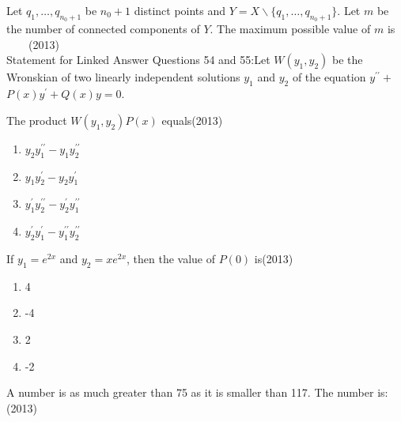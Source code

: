 \iffalse
\chapter{2013}
\author{Prajwal naik}
\section{ma}
\fi

    \item Let $q_{1}, \ldots, q_{n_{0}+1}$ be $n_{0}+1$ distinct points and $Y=X \backslash\{q_{1}, \ldots, q_{n_{0}+1}\}$. Let $m$ be the number of connected components of $Y$. The maximum possible value of $m$ is $\qquad$(\hfill{2013})\\
    {Statement for Linked Answer Questions 54 and 55:}Let $W\left(y_{1}, y_{2}\right)$ be the Wronskian of two linearly independent solutions $y_{1}$ and $y_{2}$ of the equation $y^{\prime \prime}+$ $P(x) y^{\prime}+Q(x) y=0$.
    
  \item The product $W(y_{1}, y_{2}) P(x)$ equals(\hfill{2013})
   \begin{multicols}{4}
			\begin{enumerate}

\item  $y_{2} y_{1}^{\prime \prime}-y_{1} y_{2}^{\prime \prime}$
\item  $y_{1} y_{2}^{\prime}-y_{2} y_{1}^{\prime}$
\item $y_{1}^{\prime} y_{2}^{\prime \prime}-y_{2}^{\prime} y_{1}^{\prime \prime}$

\item $y_{2}^{\prime} y_{1}^{\prime}-y_{1}^{\prime \prime} y_{2}^{\prime \prime}$

        \end{enumerate}
		\end{multicols}
  \item  If $y_{1}=e^{2 x}$ and $y_{2}=x e^{2 x}$, then the value of $P(0)$ is(\hfill{2013})

   \begin{multicols}{4}
			\begin{enumerate}
\item  4
\item -4
\item 2
\item -2

  \end{enumerate}
		\end{multicols}
  \item  A number is as much greater than 75 as it is smaller than 117. The number is:(\hfill{2013})

